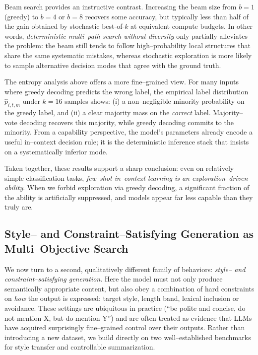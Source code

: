 Beam search provides an instructive contrast. Increasing the beam size from
$b{=}1$ (greedy) to $b{=}4$ or $b{=}8$ recovers some accuracy, but typically
less than half of the gain obtained by stochastic best-of-$k$ at equivalent
compute budgets. In other words, \emph{deterministic multi--path search without
diversity} only partially alleviates the problem: the beam still tends to
follow high--probability local structures that share the same systematic
mistakes, whereas stochastic exploration is more likely to sample alternative
decision modes that agree with the ground truth.

The entropy analysis above offers a more fine--grained view.
For many inputs where greedy decoding predicts the wrong label, the empirical
label distribution $\hat{p}_{i,t,m}$ under $k{=}16$ samples shows:
(i) a non--negligible minority probability on the greedy label, and
(ii) a clear majority mass on the \emph{correct} label. Majority--vote decoding
recovers this majority, while greedy decoding commits to the minority.
From a capability perspective, the model's parameters already encode a useful
in--context decision rule; it is the deterministic inference stack that insists
on a systematically inferior mode.

Taken together, these results support a sharp conclusion: even on relatively
simple classification tasks, \emph{few--shot in--context learning is an
exploration--driven ability}. When we forbid exploration via greedy decoding,
a significant fraction of the ability is artificially suppressed, and models
appear far less capable than they truly are.


\subsection{Style-- and Constraint--Satisfying Generation as Multi--Objective Search}
\label{subsec:style-setup}

We now turn to a second, qualitatively different family of behaviors:
\emph{style-- and constraint--satisfying generation}. Here the model must not
only produce semantically appropriate content, but also obey a combination of
hard constraints on \emph{how} the output is expressed: target style, length
band, lexical inclusion or avoidance. These settings are ubiquitous in practice
(``be polite and concise, do not mention X, but do mention Y'') and are often
treated as evidence that LLMs have acquired surprisingly fine--grained control
over their outputs. Rather than introducing a new dataset, we build directly on
two well--established benchmarks for style transfer and controllable
summarization.

